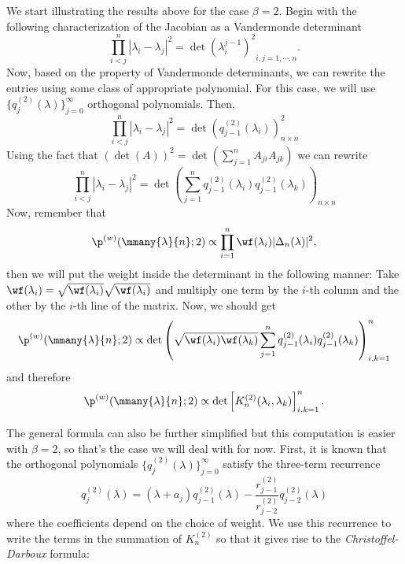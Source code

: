 We start illustrating the results above for the case $\beta=2$. Begin with the following characterization of the Jacobian as a Vandermonde determinant
\begin{equation}
	\prod_{i<j}^{n} |\lambda_i - \lambda_j|^2 = {\det(\lambda_i^{j-1})^2}_{i,j=1,\cdots,n}.
\end{equation}
Now, based on the property of Vandermonde determinants, we can rewrite the entries using some class of appropriate polynomial. For this case, we will use $\{q_j^{(2)}(\lambda)\}_{j=0}^\infty$ orthogonal polynomials. Then,
\begin{equation}
	\prod_{i<j}^{n} |\lambda_i - \lambda_j|^2 = {\det\left(q_{j-1}^{(2)}(\lambda_i)\right)}^2_{n\times n}
\end{equation}
Using the fact that $(\det(A))^2 = \det(\sum_{j=1}^{n} A_{ji} A_{jk})$ we can rewrite
\begin{equation}
	\prod_{i<j}^{n} |\lambda_i - \lambda_j|^2 = {\det\left(\sum_{j=1}^{n} q_{j-1}^{(2)}(\lambda_i) q_{j-1}^{(2)}(\lambda_k) \right)}_{n\times n}
\end{equation}
Now, remember that
\begin{equation}
	\p^{(w)}(\mmany{\lambda}{n};2) \propto \prod_{i=1}^{n} \wf(\lambda_i) |\Delta_n(\lambda)|^2,
\end{equation}
then we will put the weight inside the determinant in the following manner: Take $\wf(\lambda_i) = \sqrt{\wf(\lambda_i)}\sqrt{\wf(\lambda_i)}$ and multiply one term by the $i$-th column and the other by the $i$-th line of the matrix. Now, we should get
\begin{equation}
	\p^{(w)}(\mmany{\lambda}{n};2) \propto {\det\left(\sqrt{\wf(\lambda_i)\wf(\lambda_k)} \sum_{j=1}^{n} q_{j-1}^{(2)}(\lambda_i) q_{j-1}^{(2)}(\lambda_k) \right)}_{i,k=1}^{n}
\end{equation}
and therefore
\begin{equation}
	\p^{(w)}(\mmany{\lambda}{n};2) \propto \det\left[ K_n^{(2)}(\lambda_i, \lambda_k) \right]_{i,k=1}^{n}.
\end{equation}

The general formula can also be further simplified but this computation is easier with $\beta = 2$, so that's the case we will deal with for now. First, it is known that the orthogonal polynomials $\{q_j^{(2)}(\lambda)\}_{j=0}^\infty$ satisfy the three-term recurrence
\begin{equation}
	q_{j}^{(2)}(\lambda) = (\lambda + a_j) q_{j-1}^{(2)}(\lambda) - \frac{r_{j-1}^{(2)}}{r_{j-2}^{(2)}} q_{j-2}^{(2)}(\lambda)
\end{equation} 
where the coefficients depend on the choice of weight. We use this recurrence to write the terms in the summation of $K_n^{(2)}$ so that it gives rise to the \textit{Christoffel-Darboux} formula:

